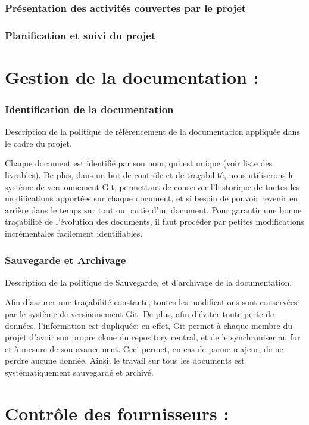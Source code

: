 \documentclass[a4paper, 18pt]{article}
\begin{document}
\section{Présentation des activités couvertes par le projet }

\section{Planification et suivi du projet }


\part{Gestion de la documentation :}

\section{Identification de la documentation}

Description de la politique de référencement de la documentation appliquée dans le cadre du projet.

Chaque document est identifié par son nom, qui est unique (voir liste des livrables). De plus, dans un but de contrôle
et de traçabilité, nous utiliserons le système de versionnement Git, permettant de conserver l'historique de toutes
les modifications apportées sur chaque document, et si besoin de pouvoir revenir en arrière dans le temps sur tout ou
partie d'un document. Pour garantir une bonne traçabilité de l'évolution des documents, il faut procéder par petites
modifications incrémentales facilement identifiables.

\section{Sauvegarde et Archivage}

Description de la politique de Sauvegarde, et d'archivage de la documentation.

Afin d'assurer une traçabilité constante, toutes les modifications sont conservées par le système de versionnement
Git. De plus, afin d'éviter toute perte de données, l'information est dupliquée: en effet, Git permet à chaque membre
du projet d'avoir son propre clone du repository central, et de le synchroniser au fur et à mesure de son avancement.
Ceci permet, en cas de panne majeur, de ne perdre aucune donnée. Ainsi, le travail sur tous les documents est
systématiquement sauvegardé et archivé.

\part{Contrôle des fournisseurs :}
\end{document}
